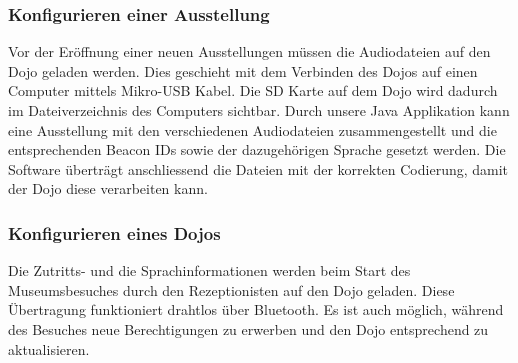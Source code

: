 \subsubsection{Konfigurieren einer Ausstellung}
Vor der Eröffnung einer neuen Ausstellungen müssen die Audiodateien auf den Dojo geladen werden. Dies geschieht mit dem Verbinden des Dojos auf einen Computer mittels Mikro-USB Kabel. Die SD Karte auf dem Dojo wird dadurch im Dateiverzeichnis des Computers sichtbar. Durch unsere Java Applikation kann eine Ausstellung mit den verschiedenen Audiodateien zusammengestellt und die entsprechenden Beacon IDs sowie der dazugehörigen Sprache gesetzt werden. Die Software überträgt anschliessend die Dateien mit der korrekten Codierung, damit der Dojo diese verarbeiten kann.

\subsubsection{Konfigurieren eines Dojos}
Die Zutritts- und die Sprachinformationen werden beim Start des Museumsbesuches durch den Rezeptionisten auf den Dojo geladen. Diese Übertragung funktioniert drahtlos über Bluetooth. Es ist auch möglich, während des Besuches neue Berechtigungen zu erwerben und den Dojo entsprechend zu aktualisieren.

